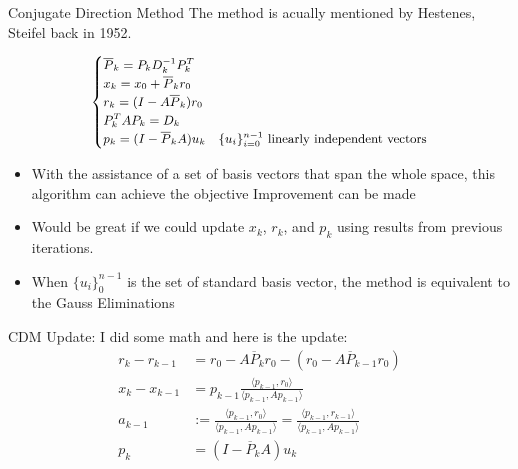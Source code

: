 \documentclass{beamer}
\begin{document}
    \begin{frame}{Conjugate Direction Method}
        The method is acually mentioned by Hestenes, Steifel back in 1952\cite{paper:cg_original}. 
        \begin{definition}
            \begin{align}\small
                \begin{cases}
                    \overline{P}_k = P_kD^{-1}_kP_k^T
                    \\
                    x_k = x_0 + \overline{P}_k r_0
                    \\
                    r_k = (I - A\overline{P}_k) r_0
                    \\
                    P^T_kAP_k = D_k
                    \\
                    p_k = (I - \overline{P}_kA)u_k & \{u_i\}_{i = 0}^{n - 1} \text{ linearly independent vectors}
                \end{cases}
            \end{align}
        \end{definition}
        \begin{itemize}\small
            \item With the assistance of a set of basis vectors that span the whole space, this algorithm can achieve the objective Improvement can be made 
            \item Would be great if we could update $x_k$, $r_k$, and $p_k$ using results from previous iterations.
            \item When $\{u_i\}_0^{n - 1}$ is the set of standard basis vector, the method is equivalent to the Gauss Eliminations
        \end{itemize}
    \end{frame}
    \begin{frame}{CDM Update: }
        I did some math and here is the update: 
        \begin{align}
            r_k - r_{k - 1} &= r_0 - A\overline{P}_kr_0 - (r_0 - A\overline{P}_{k - 1}r_0)
            \\
            x_{k} - x_{k - 1} &= 
                    p_{k - 1}\frac{\langle p_{k - 1}, r_0\rangle}{\langle p_{k - 1}, Ap_{k - 1}\rangle}
            \\
            a_{k - 1} &:= \frac{\langle p_{k - 1}, r_0\rangle}{
                        \langle p_{k - 1}, Ap_{k - 1}\rangle
                    } = 
                    \frac{\langle p_{k - 1}, r_{k - 1}\rangle}{
                        \langle p_{k - 1}, Ap_{k - 1}\rangle
                    }
            \\
            p_k &= (I - \overline{P}_kA)u_k
        \end{align}
    \end{frame}
\end{document}
